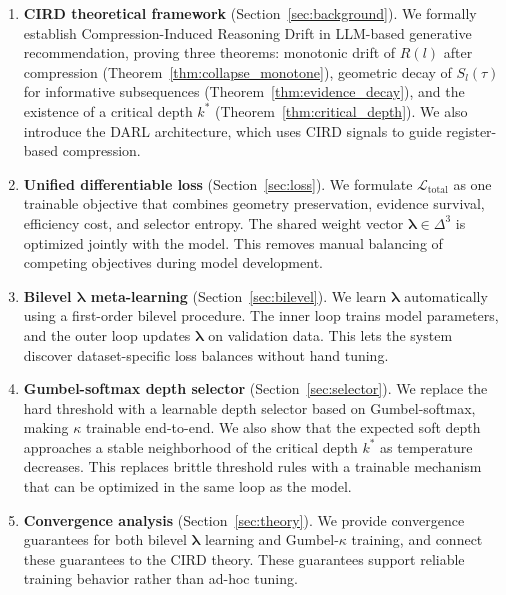 \documentclass[lettersize,journal]{IEEEtran}
\newcommand{\calL}{\mathcal{L}}
\newcommand{\lambdavec}{\boldsymbol{\lambda}}
\begin{document}
\begin{enumerate}
  \item \textbf{CIRD theoretical framework} (Section~\ref{sec:background}).
    We formally establish Compression-Induced Reasoning Drift in LLM-based
    generative recommendation, proving three theorems: monotonic
    drift of $R(l)$ after compression (Theorem~\ref{thm:collapse_monotone}),
    geometric decay of $S_l(\tau)$ for informative subsequences
    (Theorem~\ref{thm:evidence_decay}), and the existence of a
    critical depth $k^*$ (Theorem~\ref{thm:critical_depth}).
    We also introduce the DARL architecture, which uses CIRD
    signals to guide register-based compression.

  \item \textbf{Unified differentiable loss} (Section~\ref{sec:loss}).
    We formulate $\calL_{\text{total}}$ as one trainable objective
    that combines geometry preservation, evidence survival,
    efficiency cost, and selector entropy.
    The shared weight vector $\lambdavec \in \Delta^3$ is optimized
    jointly with the model.
    This removes manual balancing of competing objectives during
    model development.

  \item \textbf{Bilevel $\lambdavec$ meta-learning} (Section~\ref{sec:bilevel}).
    We learn $\lambdavec$ automatically using a first-order bilevel
    procedure.
    The inner loop trains model parameters, and the outer loop updates
    $\lambdavec$ on validation data.
    This lets the system discover dataset-specific loss balances
    without hand tuning.

  \item \textbf{Gumbel-softmax depth selector} (Section~\ref{sec:selector}).
    We replace the hard threshold with a learnable depth selector
    based on Gumbel-softmax, making $\kappa$ trainable end-to-end.
    We also show that the expected soft depth approaches a stable
    neighborhood of the critical depth $k^*$ as temperature decreases.
    This replaces brittle threshold rules with a trainable mechanism
    that can be optimized in the same loop as the model.

  \item \textbf{Convergence analysis} (Section~\ref{sec:theory}).
    We provide convergence guarantees for both bilevel
    $\lambdavec$ learning and Gumbel-$\kappa$ training, and connect
    these guarantees to the CIRD theory.
    These guarantees support reliable training behavior rather than
    ad-hoc tuning.


\end{enumerate}
\end{document}
